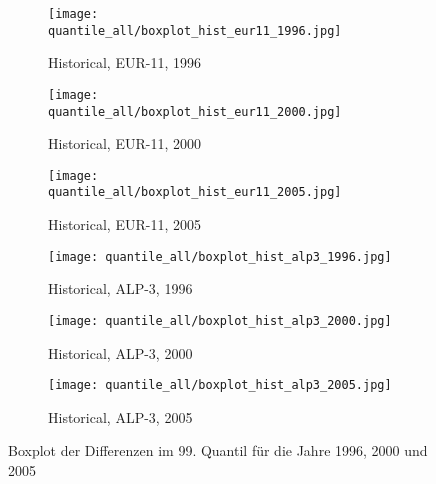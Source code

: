 \begin{figure}
	\begin{subfigure}{0.32\textwidth}
		\texttt{[image: quantile\_all/boxplot\_hist\_eur11\_1996.jpg]}
		\caption{Historical, EUR-11, 1996}
	\end{subfigure}
	\begin{subfigure}{0.32\textwidth}
		\texttt{[image: quantile\_all/boxplot\_hist\_eur11\_2000.jpg]}
		\caption{Historical, EUR-11, 2000}
	\end{subfigure}
	\begin{subfigure}{0.32\textwidth}
		\texttt{[image: quantile\_all/boxplot\_hist\_eur11\_2005.jpg]}
		\caption{Historical, EUR-11, 2005}
	\end{subfigure}
	\begin{subfigure}{0.32\textwidth}
		\texttt{[image: quantile\_all/boxplot\_hist\_alp3\_1996.jpg]}
		\caption{Historical, ALP-3, 1996}
	\end{subfigure}
	\begin{subfigure}{0.32\textwidth}
		\texttt{[image: quantile\_all/boxplot\_hist\_alp3\_2000.jpg]}
		\caption{Historical, ALP-3, 2000}
	\end{subfigure}
	\begin{subfigure}{0.32\textwidth}
		\texttt{[image: quantile\_all/boxplot\_hist\_alp3\_2005.jpg]}
		\caption{Historical, ALP-3, 2005}
	\end{subfigure}
	\caption{Boxplot der Differenzen im 99. Quantil für die Jahre 1996, 2000 und 2005}
\label{fig:quantile_all_boxplot_all_years_1}
\end{figure}

